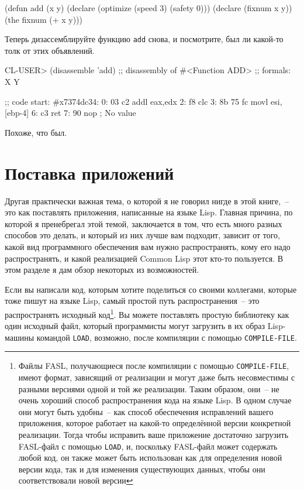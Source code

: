 \begin{myverb}
(defun add (x y)
  (declare (optimize (speed 3) (safety 0)))
  (declare (fixnum x y))
  (the fixnum (+ x y)))
\end{myverb}

Теперь дизассемблируйте функцию \lstinline{add} снова, и посмотрите, был ли какой-то толк от
этих объявлений.

\begin{myverb}
CL-USER> (disassemble 'add)
;; disassembly of #<Function ADD>
;; formals: X Y

;; code start: #x7374dc34:
   0: 03 c2    addl	eax,edx
   2: f8         clc
   3: 8b 75 fc movl	esi,[ebp-4]
   6: c3         ret
   7: 90         nop
; No value
\end{myverb}

Похоже, что был.

\section{Поставка приложений}

Другая практически важная тема, о которой я не говорил нигде в этой книге,~-- это как
поставлять приложения, написанные на языке Lisp. Главная причина, по которой я пренебрегал
этой темой, заключается в том, что есть много разных способов это делать, и который из них
лучше вам подходит, зависит от того, какой вид программного обеспечения вам нужно
распространять, кому его надо распространять, и какой реализацией Common Lisp этот кто-то
пользуется. В этом разделе я дам обзор некоторых из возможностей.

Если вы написали код, которым хотите поделиться со своими коллегами, которые тоже пишут на
языке Lisp, самый простой путь распространения~-- это распространять исходный
код\footnote{Файлы FASL, получающиеся после компиляции с помощью \lstinline{COMPILE-FILE},
  имеют формат, зависящий от реализации и могут даже быть несовместимы с разными версиями
  одной и той же реализации. Таким образом, они~-- не очень хороший способ распространения
  кода на языке Lisp. В одном случае они могут быть удобны~-- как способ обеспечения
  исправлений вашего приложения, которое работает на какой-то определённой версии
  конкретной реализации. Тогда чтобы исправить ваше приложение достаточно загрузить
  FASL-файл с помощью \lstinline{LOAD}, и, поскольку FASL-файл может содержать любой код, он
  также может быть использован как для определения новой версии кода, так и для изменения
  существующих данных, чтобы они соответствовали новой версии}. Вы можете поставлять
простую библиотеку как один исходный файл, который программисты могут загрузить в их образ
Lisp-машины командой \lstinline{LOAD}, возможно, после компиляции с помощью
\lstinline{COMPILE-FILE}.

